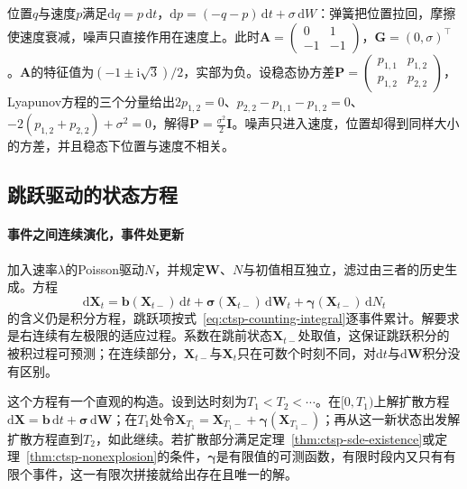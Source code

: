 \begin{example}[受噪声驱动的阻尼振子]
  \label{ex:ctsp-damped-oscillator}
  位置$q$与速度$p$满足$\mathrm dq=p\,\mathrm dt$，$\mathrm dp=(-q-p)\,\mathrm dt+\sigma\,\mathrm dW$：弹簧把位置拉回，摩擦使速度衰减，噪声只直接作用在速度上。此时$\bm A=\begin{pmatrix}0&1\\-1&-1\end{pmatrix}$，$\bm G=(0,\sigma)^\top$。$\bm A$的特征值为$(-1\pm\mathrm i\sqrt3)/2$，实部为负。设稳态协方差$\bm P=\begin{pmatrix}p_{1,1}&p_{1,2}\\p_{1,2}&p_{2,2}\end{pmatrix}$，Lyapunov方程的三个分量给出$2p_{1,2}=0$、$p_{2,2}-p_{1,1}-p_{1,2}=0$、$-2(p_{1,2}+p_{2,2})+\sigma^2=0$，解得$\bm P=\frac{\sigma^2}2\bm I$。噪声只进入速度，位置却得到同样大小的方差，并且稳态下位置与速度不相关。
\end{example}

\subsection{跳跃驱动的状态方程}
\label{sec:ctsp-jump-sde}

\paragraph{事件之间连续演化，事件处更新}
加入速率$\lambda$的Poisson驱动$N$，并规定$\bm W$、$N$与初值相互独立，滤过由三者的历史生成。方程
\begin{equation}
  \mathrm d\bm X_t=\bm b(\bm X_{t-})\,\mathrm dt+\bm\sigma(\bm X_{t-})\,\mathrm d\bm W_t+\bm\gamma(\bm X_{t-})\,\mathrm dN_t
  \label{eq:ctsp-jump-sde}
\end{equation}
的含义仍是积分方程，跳跃项按式~\eqref{eq:ctsp-counting-integral}逐事件累计。解要求是右连续有左极限的适应过程。系数在跳前状态$\bm X_{t-}$处取值，这保证跳跃积分的被积过程可预测；在连续部分，$\bm X_{t-}$与$\bm X_t$只在可数个时刻不同，对$\mathrm dt$与$\mathrm d\bm W$积分没有区别。

这个方程有一个直观的构造。设到达时刻为$T_1<T_2<\cdots$。在$[0,T_1)$上解扩散方程$\mathrm d\bm X=\bm b\,\mathrm dt+\bm\sigma\,\mathrm d\bm W$；在$T_1$处令$\bm X_{T_1}=\bm X_{T_1-}+\bm\gamma(\bm X_{T_1-})$；再从这一新状态出发解扩散方程直到$T_2$，如此继续。若扩散部分满足定理~\ref{thm:ctsp-sde-existence}或定理~\ref{thm:ctsp-nonexplosion}的条件，$\bm\gamma$是有限值的可测函数，有限时段内又只有有限个事件，这一有限次拼接就给出存在且唯一的解。

